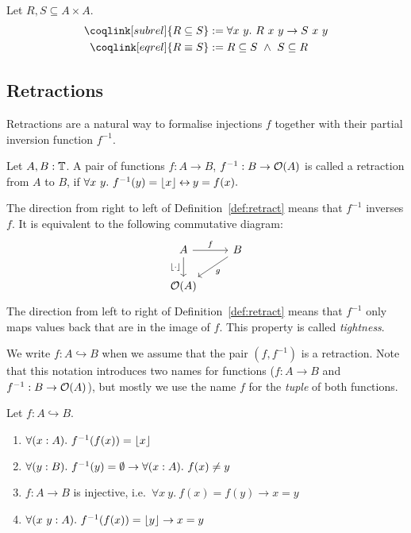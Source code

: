 \begin{definition}
  Let $R,S \subseteq A \times A$.
  \begin{align*}
    \coqlink[subrel]{R \subseteq S} &:= \forall x~y.~R~x~y \rightarrow S~x~y \\
    \coqlink[eqrel] {R \equiv S}    &:= R \subseteq S ~\land~ S \subseteq R
  \end{align*}
\end{definition}


\subsection{Retractions}
\label{sec:retracts}

Retractions are a natural way to formalise injections $f$ together with their partial inversion function $f^{-1}$.

\begin{definition}[Retraction]
  \label{def:retract}
  Let $A, B : \mathbb{T}$.  A pair of functions $f : A \to B$, $f^{-1} : B \rightarrow \mathcal{O}(A)$ is called a retraction from $A$ to $B$, if
  $\forall x~y.~f^{-1}(y) = \left\lfloor {x} \right\rfloor \mathbin{\leftrightarrow} y = f(x).$
\end{definition}

The direction from right to left of Definition~\ref{def:retract} means that $f^{-1}$ inverses $f$.  It is equivalent to the following commutative
diagram:
\[
  \begin{tikzcd}
    A \arrow[r, "f"] \arrow[d, "\Some \cdot", swap] & B \arrow[ld, "g"] \\
    \Option(A) &
  \end{tikzcd}
\]
The direction from left to right of Definition~\ref{def:retract} means that $f^{-1}$ only maps values back that are in the image of $f$.  This
property is called \textit{tightness}.

We write $f : A \hookrightarrow B$ when we assume that the pair $(f, f^{-1})$ is a retraction.  Note that this notation introduces two names for
functions ($f : A \to B$ and $f^{-1} : B \rightarrow \mathcal{O}(A)$), but mostly we use the name $f$ for the \textit{tuple} of both functions.


\begin{lemma}
  \label{lem:retracts-basic}
  Let $f : A \hookrightarrow B$.
  \begin{enumerate}
  \item \label{lem:retract_g_adjoint}
    $\forall (x:A).~f^{-1}(f(x)) = \left\lfloor {x} \right\rfloor$
  \item \label{lem:retract_g_None}
    $\forall (y:B).~f^{-1}(y) = \emptyset \rightarrow \forall (x:A).~f(x) \neq y$
  \item \label{lem:retract_f_injective}
    $f : A \to B$ is injective, i.e.\ $\forall x~y.~f(x)=f(y) \rightarrow x=y$
  \item \label{lem:retract_g_Some}
    $\forall (x~y:A).~f^{-1}(f(x)) = \left\lfloor {y} \right\rfloor \rightarrow x=y$
  \end{enumerate}
\end{lemma}

